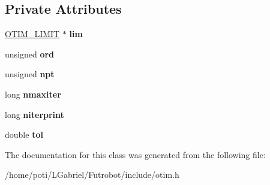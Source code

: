 \subsection*{Private Attributes}
\begin{DoxyCompactItemize}
\item 
\hyperlink{structOTIM__LIMIT}{O\+T\+I\+M\+\_\+\+L\+I\+M\+IT} $\ast$ {\bfseries lim}\hypertarget{classotim_ab9cfb76e6581ac52d7d1a1806c0b7554}{}\label{classotim_ab9cfb76e6581ac52d7d1a1806c0b7554}

\item 
unsigned {\bfseries ord}\hypertarget{classotim_a246f17b138b60ba7d464ef470ca2fa7d}{}\label{classotim_a246f17b138b60ba7d464ef470ca2fa7d}

\item 
unsigned {\bfseries npt}\hypertarget{classotim_a43fa60ba0b2e39e882e6538f7d73f0ba}{}\label{classotim_a43fa60ba0b2e39e882e6538f7d73f0ba}

\item 
long {\bfseries nmaxiter}\hypertarget{classotim_a1cb7612c651e66ac18881cfc47d9c4cb}{}\label{classotim_a1cb7612c651e66ac18881cfc47d9c4cb}

\item 
long {\bfseries niterprint}\hypertarget{classotim_a6f01f5d11394d09166d6895784dcceb8}{}\label{classotim_a6f01f5d11394d09166d6895784dcceb8}

\item 
double {\bfseries tol}\hypertarget{classotim_aa3a7dd3cac421588cd5d1bdcd8fd31e3}{}\label{classotim_aa3a7dd3cac421588cd5d1bdcd8fd31e3}

\end{DoxyCompactItemize}


The documentation for this class was generated from the following file\+:\begin{DoxyCompactItemize}
\item 
/home/poti/\+L\+Gabriel/\+Futrobot/include/otim.\+h\end{DoxyCompactItemize}
